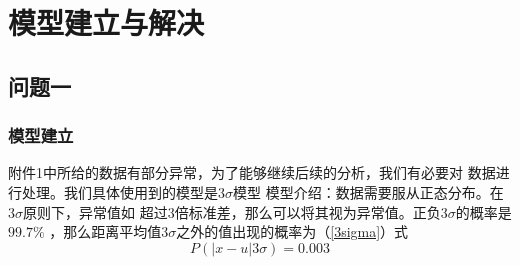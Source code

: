 \section{模型建立与解决}    
    \subsection{问题一}
        \subsubsection{模型建立}
        附件1中所给的数据有部分异常，为了能够继续后续的分析，我们有必要对
        数据进行处理。我们具体使用到的模型是$3\sigma$模型
        模型介绍：数据需要服从正态分布。在$3\sigma$原则下，异常值如
        超过$3$倍标准差，那么可以将其视为异常值。正负$3\sigma$的概率是$99.7\%$
        ，那么距离平均值$3\sigma$之外的值出现的概率为（\ref{3sigma}）式
        \begin{equation}
            P(|x-u| 3\sigma) = 0.003
            \label{3sigma}
        \end{equation}
        
